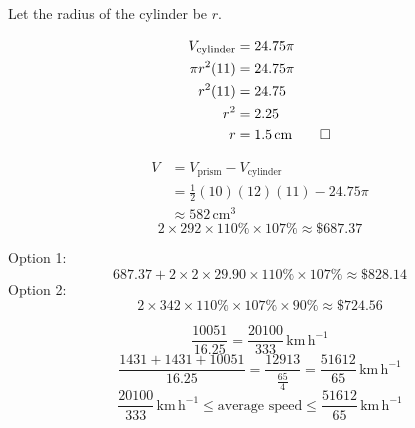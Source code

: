 \documentclass[]{article}
\begin{document}
Let the radius of the cylinder be \(r\).

\[\begin{aligned}
    V_{\text{cylinder}}&=24.75\pi\\
    \pi r^2(11)&=24.75\pi\\
    r^2(11)&=24.75\\
    r^2&=2.25\\
    r&=1.5\,\text{cm}\qed
\end{aligned}\]

\[\begin{aligned}
    V&=V_\text{prism}-V_\text{cylinder}\\
    &=\frac12(10)(12)(11)-24.75\pi\\
    &\approx582\,\text{cm}^3
\end{aligned}\]
\[2\times292\times110\%\times107\%\approx\$687.37\]

Option 1:
\[687.37+2\times2\times29.90\times110\%\times107\%\approx\$828.14\]
Option 2:
\[2\times342\times110\%\times107\%\times90\%\approx\$724.56\]

\[\frac{10051}{16.25}=\frac{20100}{333}\,\text{km}\,\text{h}^{-1}\]
\[\frac{1431+1431+10051}{16.25}=\frac{12913}{\frac{65}{4}}=\frac{51612}{65}\,\text{km}\,\text{h}^{-1}\]
\[\frac{20100}{333}\,\text{km}\,\text{h}^{-1}\leqslant\text{average speed}\leqslant\frac{51612}{65}\,\text{km}\,\text{h}^{-1}\]
\end{document}
